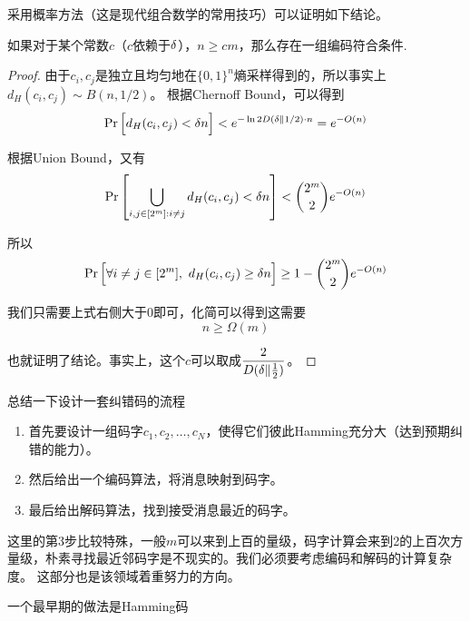 采用概率方法（这是现代组合数学的常用技巧）可以证明如下结论。
\begin{theorem}
    如果对于某个常数$c$（$c$依赖于$\delta$），$n \ge cm$，那么存在一组编码符合条件.
\end{theorem}
\begin{proof}
    由于$c_i, c_j$是独立且均匀地在$\{0,1\}^n$熵采样得到的，所以事实上$d_H(c_i,c_j) \sim B(n, 1/2)$。 根据Chernoff Bound，可以得到 
\[
\Pr \Big[
d_H(c_i, c_j) < \delta n  
\Big] < e^{- \ln 2  D(\delta \| 1/2) \cdot n} = e^{-O(n)}
\]

根据Union Bound，又有 
\[
\Pr \left[
    \bigcup_{i,j \in [2^m]: i\neq j} d_H(c_i, c_j) < \delta n
\right] < \binom{2^m}{2}e^{-O(n)}
\]

所以 
\[
\Pr \Big[
    \forall i\neq j \in [2^m],\ d_H(c_i,c_j) \ge \delta n
\Big] \ge 1 - \binom{2^m}{2}e^{-O(n)}
\]

我们只需要上式右侧大于0即可，化简可以得到这需要 
\[
n \ge \Omega(m)
\]

也就证明了结论。事实上，这个$c$可以取成$\dfrac{2}{D(\delta \| \frac 12)}$。
\end{proof}

总结一下设计一套纠错码的流程 
\begin{enumerate}
    \item 首先要设计一组码字$c_1,c_2,\dots, c_N$，使得它们彼此Hamming充分大（达到预期纠错的能力）。
    \item 然后给出一个编码算法，将消息映射到码字。
    \item 最后给出解码算法，找到接受消息最近的码字。
\end{enumerate}

这里的第3步比较特殊，一般$m$可以来到上百的量级，码字计算会来到2的上百次方量级，朴素寻找最近邻码字是不现实的。我们必须要考虑编码和解码的计算复杂度。 这部分也是该领域着重努力的方向。 

一个最早期的做法是Hamming码


